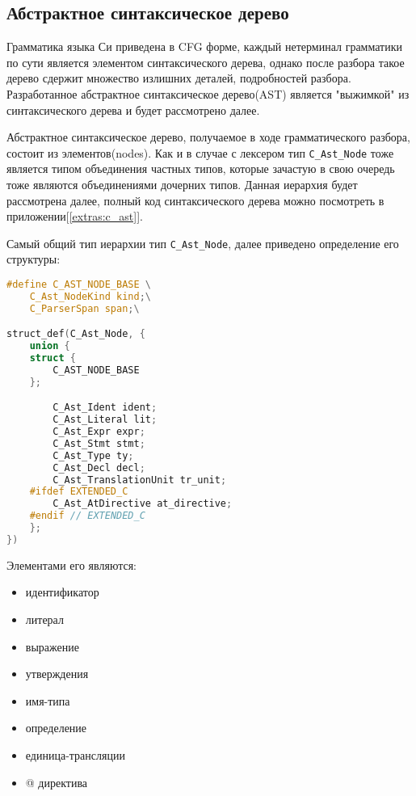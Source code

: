 
\subsection{Абстрактное синтаксическое дерево}

Грамматика языка Си приведена в CFG форме, каждый нетерминал грамматики по сути является элементом синтаксического дерева, 
однако после разбора такое дерево сдержит множество излишних деталей, подробностей разбора.
Разработанное абстрактное синтаксическое дерево(AST) является "выжимкой" из синтаксического дерева и будет рассмотрено далее.

Абстрактное синтаксическое дерево, получаемое в ходе грамматического разбора, состоит из элементов(nodes).
Как и в случае с лексером тип \verb|C_Ast_Node| тоже является типом объединения частных типов, которые зачастую в свою очередь тоже являются объединениями дочерних типов.
Данная иерархия будет рассмотрена далее, полный код синтаксического дерева можно посмотреть в приложении[\ref{extras:c_ast}].

Самый общий тип иерархии тип \verb|C_Ast_Node|, далее приведено определение его структуры:


\begin{lstlisting}[language=c, caption={Структура элемента AST}, label={parsing:ast:node-struct}]
#define C_AST_NODE_BASE \
    C_Ast_NodeKind kind;\
    C_ParserSpan span;\

struct_def(C_Ast_Node, {
    union {
    struct {
        C_AST_NODE_BASE
    };

        C_Ast_Ident ident;
        C_Ast_Literal lit;
        C_Ast_Expr expr;
        C_Ast_Stmt stmt;
        C_Ast_Type ty;
        C_Ast_Decl decl;
        C_Ast_TranslationUnit tr_unit;
    #ifdef EXTENDED_C
        C_Ast_AtDirective at_directive;
    #endif // EXTENDED_C
    };
})
\end{lstlisting}

Элементами его являются:
\begin{itemize}
    \item идентификатор
    \item литерал
    \item выражение
    \item утверждения
    \item имя-типа
    \item определение
    \item единица-трансляции
    \item @ директива
\end{itemize}

